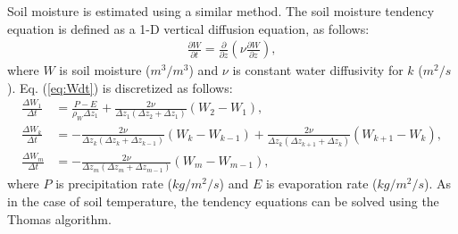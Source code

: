 Soil moisture is estimated using a similar method.
The soil moisture tendency equation is defined as a 1-D vertical diffusion equation, as follows:
\begin{align}
  \frac{\partial W}{\partial t} = \frac{\partial}{\partial z} \left( \nu \frac{\partial W}{\partial z} \right),
  \label{eq:Wdt}
\end{align}
where $W$ is soil moisture ($m^3/m^3$) and $\nu$ is constant water diffusivity for $k$ ($m^2/s$).
Eq. (\ref{eq:Wdt}) is discretized as follows:
\begin{align}
  \frac{\Delta W_{1}}{\Delta t} &= \frac{P - E}{\rho_{W}\Delta z_{1}} + \frac{2\nu}{\Delta z_{1}(\Delta z_{2}+\Delta z_{1})} (W_{2}-W_{1}), \\
  \frac{\Delta W_{k}}{\Delta t} &= - \frac{2\nu}{\Delta z_{k}(\Delta z_{k}+\Delta z_{k-1})} (W_{k}-W_{k-1}) + \frac{2\nu}{\Delta z_{k}(\Delta z_{k+1}+\Delta z_{k})} (W_{k+1}-W_{k}), \\
  \frac{\Delta W_{m}}{\Delta t} &= - \frac{2\nu}{\Delta z_{m}(\Delta z_{m}+\Delta z_{m-1})} (W_{m}-W_{m-1}),
\end{align}
where $P$ is precipitation rate ($kg/m^2/s$) and $E$ is evaporation rate ($kg/m^2/s$).
As in the case of soil temperature, the tendency equations can be solved using the Thomas algorithm.

